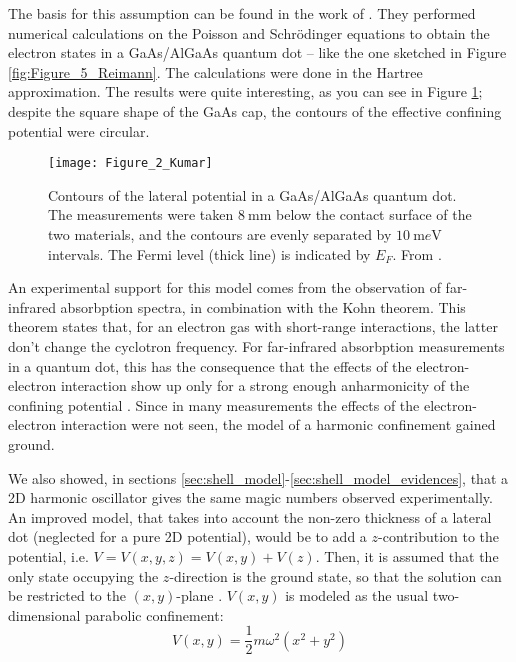 The basis for this assumption can be found in the work of \cite{Kumar1990}. They performed numerical calculations on the Poisson and Schr\"{o}dinger equations to obtain the electron states in a GaAs/AlGaAs quantum dot -- like the one sketched in Figure \ref{fig:Figure_5_Reimann}. The calculations were done in the Hartree approximation. The results were quite interesting, as you can see in Figure \ref{fig:Figure_2_Kumar}; despite the square shape of the GaAs cap, the contours of the effective confining potential were circular.

\begin{figure}[h]%
	\centering
	\texttt{[image: Figure\_2\_Kumar]}
	\caption{Contours of the lateral potential in a GaAs/AlGaAs quantum dot. The measurements were taken $\SI{8}{\milli\meter}$ below the contact surface of the two materials, and the contours are evenly separated by $\SI{10}{\milli e\volt}$ intervals. The Fermi level (thick line) is indicated by $E_F$. From \cite{Kumar1990}.}
	\label{fig:Figure_2_Kumar}
\end{figure}

An experimental support for this model comes from the observation of far-infrared absorbption spectra, in combination with the Kohn theorem. This theorem \citep[see][]{Kohn1961} states that, for an electron gas with short-range interactions, the latter don't change the cyclotron frequency. For far-infrared absorbption measurements in a quantum dot, this has the consequence that the effects of the electron-electron interaction show up only for a strong enough anharmonicity of the confining potential \citep[see][]{Reimann2002}. Since in many measurements the effects of the electron-electron interaction were not seen, the model of a harmonic confinement gained ground.

We also showed, in sections \ref{sec:shell_model}-\ref{sec:shell_model_evidences}, that a 2D harmonic oscillator gives the same magic numbers observed experimentally. An improved model, that takes into account the non-zero thickness of a lateral dot (neglected for a pure 2D potential), would be to add a $z$-contribution to the potential, i.e. $V=V(x,y,z) = V(x,y) + V(z)$. Then, it is assumed that the only state occupying the $z$-direction is the ground state, so that the solution can be restricted to the $(x,y)$-plane \citep[see][]{Reimann2002}. $V(x,y)$ is modeled as the usual two-dimensional parabolic confinement:
\begin{equation}
	V(x,y)=\frac{1}{2}m\omega^2(x^2+y^2)
\end{equation}

